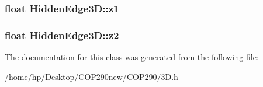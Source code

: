 \subsubsection[{\texorpdfstring{z1}{z1}}]{\setlength{\rightskip}{0pt plus 5cm}float Hidden\+Edge3\+D\+::z1}\hypertarget{class_hidden_edge3_d_ae69d570fdf699cb4ea7cd042610bdf44}{}\label{class_hidden_edge3_d_ae69d570fdf699cb4ea7cd042610bdf44}
\subsubsection[{\texorpdfstring{z2}{z2}}]{\setlength{\rightskip}{0pt plus 5cm}float Hidden\+Edge3\+D\+::z2}\hypertarget{class_hidden_edge3_d_a0434915b2dd8ae71eccf8ecdba418da5}{}\label{class_hidden_edge3_d_a0434915b2dd8ae71eccf8ecdba418da5}


The documentation for this class was generated from the following file\+:\begin{DoxyCompactItemize}
\item 
/home/hp/\+Desktop/\+C\+O\+P290new/\+C\+O\+P290/\hyperlink{3_d_8h}{3\+D.\+h}\end{DoxyCompactItemize}
